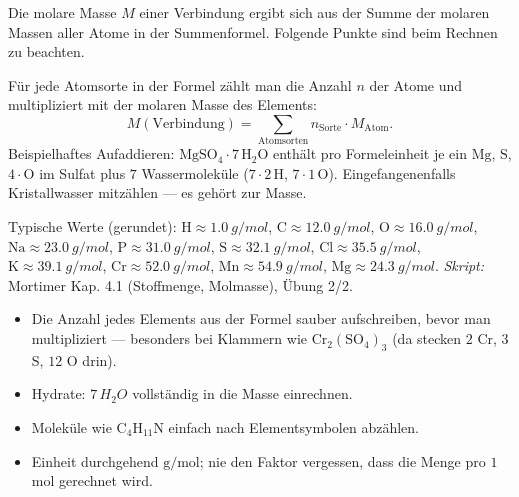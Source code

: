 

Die molare Masse $M$ einer Verbindung ergibt sich aus der Summe der molaren
Massen aller Atome in der Summenformel. Folgende Punkte sind beim Rechnen zu
beachten.

\begin{werkzeugkasten}
Für jede Atomsorte in der Formel zählt man die Anzahl $n$ der Atome und
multipliziert mit der molaren Masse des Elements:
\begin{equation}
  M(\mathrm{Verbindung})
  = \sum_{\text{Atomsorten}} n_{\text{Sorte}} \cdot M_{\text{Atom}}.
\end{equation}
Beispielhaftes Aufaddieren: $\mathrm{MgSO_4 \cdot 7\,H_2O}$ enthält pro
Formeleinheit je ein $\mathrm{Mg}$, $\mathrm{S}$, $4\cdot\mathrm{O}$ im Sulfat
plus $7$ Wassermoleküle ($7\cdot 2\,\mathrm{H}$, $7\cdot 1\,\mathrm{O}$).
Eingefangenenfalls Kristallwasser mitzählen --- es gehört zur Masse.

Typische Werte (gerundet): $\mathrm{H} \approx \qty{1.0}{g/mol}$,
$\mathrm{C} \approx \qty{12.0}{g/mol}$, $\mathrm{O} \approx \qty{16.0}{g/mol}$,
$\mathrm{Na} \approx \qty{23.0}{g/mol}$, $\mathrm{P} \approx \qty{31.0}{g/mol}$,
$\mathrm{S} \approx \qty{32.1}{g/mol}$, $\mathrm{Cl} \approx \qty{35.5}{g/mol}$,
$\mathrm{K} \approx \qty{39.1}{g/mol}$, $\mathrm{Cr} \approx \qty{52.0}{g/mol}$,
$\mathrm{Mn} \approx \qty{54.9}{g/mol}$, $\mathrm{Mg} \approx \qty{24.3}{g/mol}$.
\textit{Skript:} Mortimer Kap. 4.1 (Stoffmenge, Molmasse), Übung 2/2.
\end{werkzeugkasten}

\begin{achtung}
\begin{itemize}
  \item Die Anzahl jedes Elements aus der Formel sauber aufschreiben, bevor man
        multipliziert --- besonders bei Klammern wie
        $\mathrm{Cr_2(SO_4)_3}$ (da stecken $2$ Cr, $3$ S, $12$ O drin).
  \item Hydrate: $7\,H_2O$ vollständig in die Masse einrechnen.
  \item Moleküle wie $\mathrm{C_4H_{11}N}$ einfach nach Elementsymbolen
        abzählen.
  \item Einheit durchgehend $\mathrm{g/mol}$; nie den Faktor vergessen, dass
        die Menge pro $1$ mol gerechnet wird.
\end{itemize}
\end{achtung}
